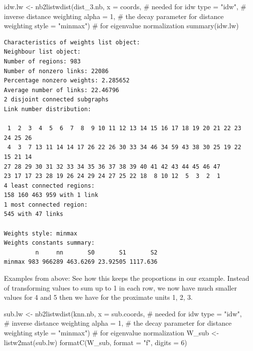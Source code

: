 \documentclass[
  letterpaper,
  DIV=11,
  numbers=noendperiod]{scrreprt}
\newenvironment{Shaded}{\begin{snugshade}}{\end{snugshade}}
\newcommand{\AttributeTok}[1]{\textcolor[rgb]{0.40,0.45,0.13}{#1}}
\newcommand{\CommentTok}[1]{\textcolor[rgb]{0.37,0.37,0.37}{#1}}
\newcommand{\DecValTok}[1]{\textcolor[rgb]{0.68,0.00,0.00}{#1}}
\newcommand{\FunctionTok}[1]{\textcolor[rgb]{0.28,0.35,0.67}{#1}}
\newcommand{\NormalTok}[1]{\textcolor[rgb]{0.00,0.23,0.31}{#1}}
\newcommand{\OtherTok}[1]{\textcolor[rgb]{0.00,0.23,0.31}{#1}}
\newcommand{\StringTok}[1]{\textcolor[rgb]{0.13,0.47,0.30}{#1}}
\begin{document}
\begin{Shaded}
\begin{Highlighting}[]
\NormalTok{idw.lw }\OtherTok{\textless{}{-}} \FunctionTok{nb2listwdist}\NormalTok{(dist\_3.nb,}
                       \AttributeTok{x =}\NormalTok{ coords, }\CommentTok{\# needed for idw}
                       \AttributeTok{type =} \StringTok{"idw"}\NormalTok{, }\CommentTok{\# inverse distance weighting}
                       \AttributeTok{alpha =} \DecValTok{1}\NormalTok{, }\CommentTok{\# the decay parameter for distance weighting}
                       \AttributeTok{style =} \StringTok{"minmax"}\NormalTok{) }\CommentTok{\# for eigenvalue normalization}
\FunctionTok{summary}\NormalTok{(idw.lw)}
\end{Highlighting}
\end{Shaded}

\begin{verbatim}
Characteristics of weights list object:
Neighbour list object:
Number of regions: 983 
Number of nonzero links: 22086 
Percentage nonzero weights: 2.285652 
Average number of links: 22.46796 
2 disjoint connected subgraphs
Link number distribution:

 1  2  3  4  5  6  7  8  9 10 11 12 13 14 15 16 17 18 19 20 21 22 23 24 25 26 
 4  3  7 13 11 14 14 17 26 22 26 30 33 34 46 34 59 43 38 30 25 19 22 15 21 14 
27 28 29 30 31 32 33 34 35 36 37 38 39 40 41 42 43 44 45 46 47 
23 17 17 23 28 19 26 24 29 24 27 25 22 18  8 10 12  5  3  2  1 
4 least connected regions:
158 160 463 959 with 1 link
1 most connected region:
545 with 47 links

Weights style: minmax 
Weights constants summary:
         n     nn       S0       S1       S2
minmax 983 966289 463.6269 23.92505 1117.636
\end{verbatim}

Examples from above: See how this keeps the proportions in our example.
Instead of transforming values to sum up to 1 in each row, we now have
much smaller values for 4 and 5 then we have for the proximate units 1,
2, 3.

\begin{Shaded}
\begin{Highlighting}[]
\NormalTok{sub.lw }\OtherTok{\textless{}{-}} \FunctionTok{nb2listwdist}\NormalTok{(knn.nb,}
                       \AttributeTok{x =}\NormalTok{ sub.coords, }\CommentTok{\# needed for idw}
                       \AttributeTok{type =} \StringTok{"idw"}\NormalTok{, }\CommentTok{\# inverse distance weighting}
                       \AttributeTok{alpha =} \DecValTok{1}\NormalTok{, }\CommentTok{\# the decay parameter for distance weighting}
                       \AttributeTok{style =} \StringTok{"minmax"}\NormalTok{) }\CommentTok{\# for eigenvalue normalization}
\NormalTok{W\_sub }\OtherTok{\textless{}{-}} \FunctionTok{listw2mat}\NormalTok{(sub.lw)}
\FunctionTok{formatC}\NormalTok{(W\_sub, }\AttributeTok{format =} \StringTok{"f"}\NormalTok{, }\AttributeTok{digits =} \DecValTok{6}\NormalTok{)}
\end{Highlighting}
\end{Shaded}
\end{document}
